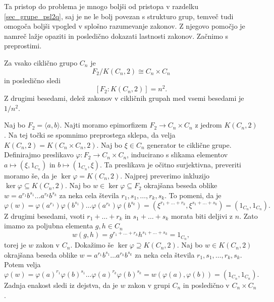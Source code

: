 Ta pristop do problema je mnogo boljši od pristopa v razdelku \ref{sec_grupe_psl2q}, saj je ne le bolj povezan s strukturo grup, temveč tudi omogoča boljši vpogled v splošno razumevanje zakonov.
Z njegovo pomočjo je namreč lažje opaziti in posledično dokazati lastnosti zakonov. Začnimo s preprostimi.
\begin{trditev}
\label{trd_lastnosti_zakonov_ciklicne}
 Za vsako ciklično grupo $C_n$ je \begin{equation*}
 F_2 / K(C_n, 2) \cong C_n \times C_n
 \end{equation*}  
 in posledično sledi \begin{equation*}
\left[ F_2 : K(C_n, 2) \right] = n^2.
 \end{equation*}  
Z drugimi besedami, delež zakonov v cikličnih grupah med vsemi besedami je $1 / n^2$.
\end{trditev}
\begin{dokaz}
Naj bo $F_2 = \langle a, b \rangle$.
Najti moramo epimorfizem $F_2 \to C_n \times C_n$ z jedrom $K(C_n ,2)$. Na tej točki se spomnimo preprostega sklepa, da velja $K(C_n, 2) = K(C_n \times C_n, 2)$. Naj bo $\xi \in C_n$ generator te ciklične grupe. Definirajmo preslikavo $\varphi: F_2 \to C_n \times C_n$,
inducirano s slikama elementov $a \mapsto (\xi, 1_{C_n})$ in $b \mapsto (1_{C_n}, \xi)$.
Ta preslikava je očitno surjektivna, preveriti moramo še, da je $\ker \varphi = K(C_n, 2)$. Najprej preverimo inkluzijo $\ker \varphi \subseteq K(C_n, 2)$.
Naj bo $w  \in \ker \varphi \subseteq  F_2$ okrajšana beseda oblike $w = a^{r_1} b^{s_1} \ldots a^{r_{k}} b^{s_k}$ za neka cela števila $r_1, s_1, \ldots , r_k , s_k$. To pomeni, da je \begin{equation*}
\varphi(w) = \varphi(a^{r_1}) \varphi(b^{s_1}) \ldots \varphi(a^{r_k}) \varphi(b^{s_k}) = \left( \xi^{r_1 + \ldots + r_k}, \xi^{s_1 + \ldots + s_k} \right) = \left( 1_{C_n} , 1_{C_n} \right).
\end{equation*}  
Z drugimi besedami, vsoti $r_1 + \ldots + r_k$ in $s_1 + \ldots + s_k$ morata biti deljivi z $n$. Zato imamo za poljubna elementa $g, h \in C_n$ \begin{equation*}
w(g, h) =  g^{r_1 + \ldots + r_k} h^{s_1 + \ldots + s_k} = 1_{C_n},
\end{equation*}
torej je $w$ zakon v $C_n$. Dokažimo še $\ker \varphi \supseteq K(C_n, 2)$. Naj bo $w \in K(C_n, 2)$ okrajšana beseda oblike $w = a^{r_1} b^{s_1} \ldots a^{r_{k}} b^{s_k}$ za neka cela števila $r_1, s_1, \ldots , r_k , s_k$.
Potem velja \begin{equation*}
    \varphi(w) = \varphi(a)^{r_1} \varphi(b)^{s_1} \ldots \varphi(a)^{r_k} \varphi(b)^{s_k} = w(\varphi(a), \varphi(b)) = (1_{C_n} , 1_{C_n}).
    \end{equation*}
    Zadnja enakost sledi iz dejstva, da je $w$ zakon v grupi $C_n$ in posledično v $C_n \times C_n$.
\end{dokaz}
